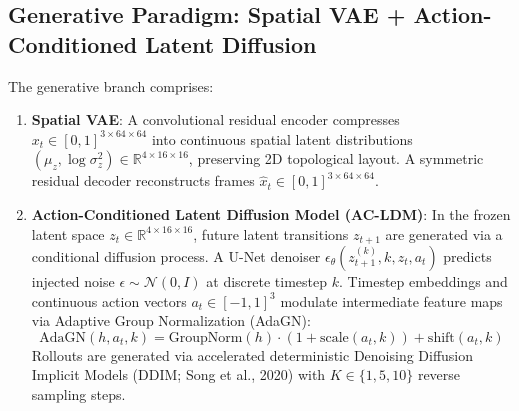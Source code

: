 \documentclass{article}
\begin{document}
\subsection{Generative Paradigm: Spatial VAE + Action-Conditioned Latent Diffusion}
The generative branch comprises:
\begin{enumerate}
    \item \textbf{Spatial VAE}: A convolutional residual encoder compresses $x_t \in [0, 1]^{3 \times 64 \times 64}$ into continuous spatial latent distributions $(\mu_z, \log \sigma_z^2) \in \mathbb{R}^{4 \times 16 \times 16}$, preserving 2D topological layout. A symmetric residual decoder reconstructs frames $\hat{x}_t \in [0, 1]^{3 \times 64 \times 64}$.
    \item \textbf{Action-Conditioned Latent Diffusion Model (AC-LDM)}: In the frozen latent space $z_t \in \mathbb{R}^{4 \times 16 \times 16}$, future latent transitions $z_{t+1}$ are generated via a conditional diffusion process. A U-Net denoiser $\epsilon_\theta(z_{t+1}^{(k)}, k, z_t, a_t)$ predicts injected noise $\epsilon \sim \mathcal{N}(0, I)$ at discrete timestep $k$. Timestep embeddings and continuous action vectors $a_t \in [-1, 1]^3$ modulate intermediate feature maps via Adaptive Group Normalization (AdaGN):
    \begin{equation}
        \text{AdaGN}(h, a_t, k) = \text{GroupNorm}(h) \cdot (1 + \text{scale}(a_t, k)) + \text{shift}(a_t, k)
    \end{equation}
    Rollouts are generated via accelerated deterministic Denoising Diffusion Implicit Models (DDIM; Song et al., 2020) with $K \in \{1, 5, 10\}$ reverse sampling steps.
\end{enumerate}
\end{document}
